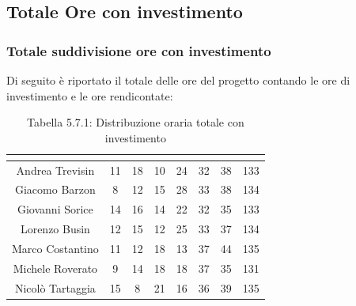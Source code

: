 \subsection{Totale Ore con investimento}

\subsubsection{Totale suddivisione ore con investimento}
Di seguito è riportato il totale delle ore del progetto contando le ore di investimento e le ore rendicontate:

\renewcommand{\arraystretch}{1.5}
\begin{table}[H]
\begin{center}
\begin{tabular}{|c|c|c|c|c|c|c|c|}
\hline
\rowcolor{title_row}
\textbf{\color{title_text}{Nome}} & \textbf{\color{title_text}{Resp.}} & \textbf{\color{title_text}{Ammi.}} & \textbf{\color{title_text}{Analist.}} & \textbf{\color{title_text}{Progett.}} & \textbf{\color{title_text}{Program.}} & \textbf{\color{title_text}{Verific.}} & \textbf{\color{title_text}{Totale}} \\ \hline
Andrea Trevisin  & 11 & 18 & 10 & 24 & 32 & 38 & 133 \\ \hline
Giacomo Barzon   & 8 & 12 & 15 & 28 & 33 & 38 & 134 \\ \hline
Giovanni Sorice  & 14 & 16 & 14 & 22 & 32 & 35 & 133 \\ \hline
Lorenzo Busin    & 12 & 15 & 12 & 25 & 33 & 37 & 134 \\ \hline
Marco Costantino & 11 & 12 & 18 & 13 & 37 & 44 & 135 \\ \hline
Michele Roverato & 9 & 14 & 18 & 18 & 37 & 35 & 131 \\ \hline
Nicolò Tartaggia & 15 & 8 & 21 & 16 & 36 & 39 & 135  \\ \hline
\end{tabular}
\caption{Tabella 5.7.1: Distribuzione oraria totale con investimento\label{}}
\end{center}
\end{table}
\renewcommand{\arraystretch}{1}

